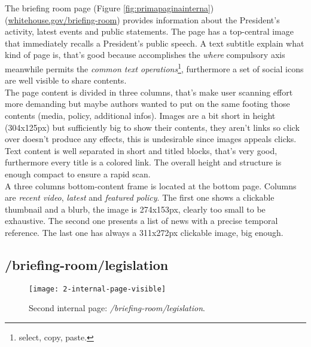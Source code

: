 \documentclass[
10pt, %
a4paper, %
oneside, %
headinclude,footinclude, %
BCOR5mm, %
]{scrartcl}
\begin{document}
	The briefing room page (Figure \ref{fig:primapaginainterna}) (\href{http://www.whitehouse.gov/briefing-room}{whitehouse.gov/briefing-room}) provides information about the President's activity, latest events and public statements. The page has a top-central image that immediately recalls a President's public speech. A text subtitle explain what kind of page is, that's good because accomplishes the \emph{where} compulsory axis meanwhile permits the \emph{common text operations}\footnote{select, copy, paste.}, furthermore a set of social icons are well visible to share contents. \\
	The page content is divided in three columns, that's make user scanning effort more demanding but maybe authors wanted to put on the same footing those contents (media, policy, additional infos). Images are a bit short in height (304x125px) but sufficiently big to show their contents, they aren't links so click over doesn't produce any effects, this is undesirable since images appeals clicks. \\
	Text content is well separated in short and titled blocks, that's very good, furthermore every title is a colored link. The overall height and structure is enough compact to ensure a rapid scan. \\
	A three columns bottom-content frame is located at the bottom page. Columns are \emph{recent video}, \emph{latest} and \emph{featured policy}. The first one shows a clickable thumbnail and a blurb, the image is 274x153px, clearly too small to be exhaustive. The second one presents a list of news with a precise temporal reference. The last one has always a 311x272px clickable image, big enough.

	\newpage
	\subsection{/briefing-room/legislation}
	\label{secondapaginainterna}

	\begin{figure}[h!]
	\centering 
	\centerline{\texttt{[image: 2-internal-page-visible]}}
	\caption[Second internal page: /briefing-room/legislation]{Second internal page: \emph{/briefing-room/legislation}.}
	\label{fig:secondapaginainterna} 
	\end{figure}
\end{document}
